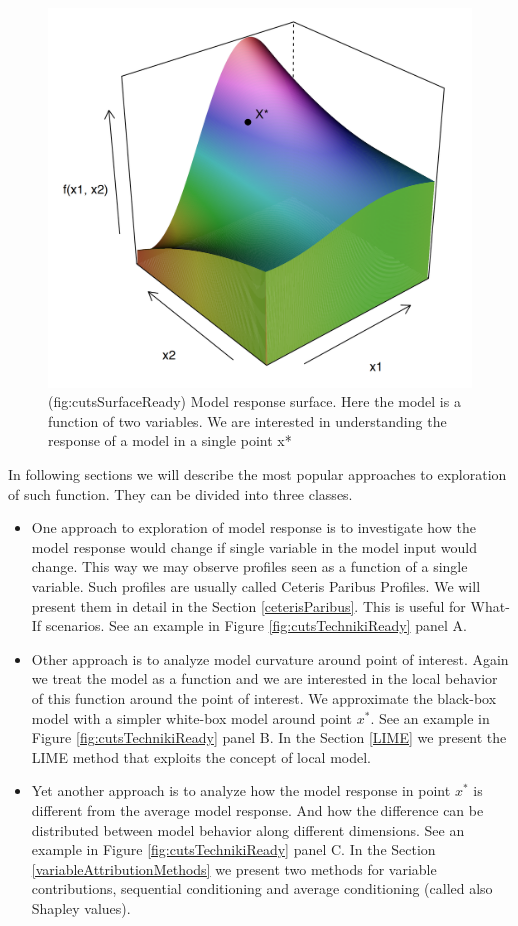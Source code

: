 \documentclass[]{krantz}
\providecommand{\tightlist}{%
  \setlength{\itemsep}{0pt}\setlength{\parskip}{0pt}}
\theoremstyle{definition}
\theoremstyle{definition}
\theoremstyle{definition}
\theoremstyle{remark}
\begin{document}
\begin{figure}

{\centering \includegraphics[width=0.6\linewidth]{figure/cuts_surface_ready_punkt} 

}

\caption{(fig:cutsSurfaceReady) Model response surface. Here the model is a function of two variables.  We are interested in understanding the response of a model in a single point x*}\label{fig:cutsSurfaceReady}
\end{figure}

In following sections we will describe the most popular approaches to
exploration of such function. They can be divided into three classes.

\begin{itemize}
\tightlist
\item
  One approach to exploration of model response is to investigate how
  the model response would change if single variable in the model input
  would change. This way we may observe profiles seen as a function of a
  single variable. Such profiles are usually called Ceteris Paribus
  Profiles. We will present them in detail in the Section
  \ref{ceterisParibus}. This is useful for What-If scenarios. See an
  example in Figure \ref{fig:cutsTechnikiReady} panel A.
\item
  Other approach is to analyze model curvature around point of interest.
  Again we treat the model as a function and we are interested in the
  local behavior of this function around the point of interest. We
  approximate the black-box model with a simpler white-box model around
  point \(x^*\). See an example in Figure \ref{fig:cutsTechnikiReady}
  panel B. In the Section \ref{LIME} we present the LIME method that
  exploits the concept of local model.
\item
  Yet another approach is to analyze how the model response in point
  \(x^*\) is different from the average model response. And how the
  difference can be distributed between model behavior along different
  dimensions. See an example in Figure \ref{fig:cutsTechnikiReady} panel
  C. In the Section \ref{variableAttributionMethods} we present two
  methods for variable contributions, sequential conditioning and
  average conditioning (called also Shapley values).
\end{itemize}
\end{document}
